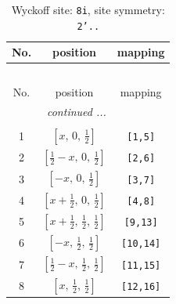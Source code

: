 \documentclass[fleqn,8pt]{jsarticle}
\begin{document}
\renewcommand{\arraystretch}{1.2}
\begin{longtable}{ccc}
\caption{Wyckoff site: {\tt 8i}, site symmetry: {\tt 2'..}}
 \\
 \hline \hline
No. & position & mapping \\ \hline \endfirsthead

\multicolumn{2}{l}{\tablename\ \thetable{}} \\
 \hline \hline
No. & position & mapping \\ \hline \endhead

 \hline \hline
\multicolumn{2}{r}{\footnotesize\it continued ...} \\ \endfoot

 \hline \hline
\multicolumn{2}{r}{} \\ \endlastfoot

1 & $\left[ x,\, 0,\, \frac{1}{2} \right]$ & {\tt [1,5]} \\ \hline
2 & $\left[ \frac{1}{2} - x,\, 0,\, \frac{1}{2} \right]$ & {\tt [2,6]} \\ \hline
3 & $\left[ - x,\, 0,\, \frac{1}{2} \right]$ & {\tt [3,7]} \\ \hline
4 & $\left[ x + \frac{1}{2},\, 0,\, \frac{1}{2} \right]$ & {\tt [4,8]} \\ \hline
5 & $\left[ x + \frac{1}{2},\, \frac{1}{2},\, \frac{1}{2} \right]$ & {\tt [9,13]} \\ \hline
6 & $\left[ - x,\, \frac{1}{2},\, \frac{1}{2} \right]$ & {\tt [10,14]} \\ \hline
7 & $\left[ \frac{1}{2} - x,\, \frac{1}{2},\, \frac{1}{2} \right]$ & {\tt [11,15]} \\ \hline
8 & $\left[ x,\, \frac{1}{2},\, \frac{1}{2} \right]$ & {\tt [12,16]} \\
\end{longtable}
\renewcommand{\arraystretch}{1.2}
\end{document}
